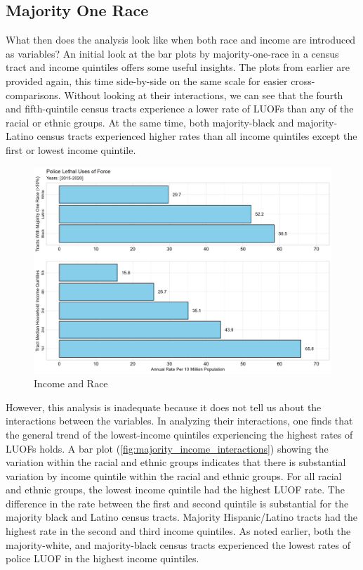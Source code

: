 \documentclass[12pt]{article}
\begin{document}
\subsection{Majority One Race}

What then does the analysis look like when both race and income are introduced as variables? An initial look at the bar plots by majority-one-race in a census tract and income quintiles offers some useful insights. The plots from earlier are provided again, this time side-by-side on the same scale for easier cross-comparisons. Without looking at their interactions, we can see that the fourth and fifth-quintile census tracts experience a lower rate of LUOFs than any of the racial or ethnic groups. At the same time, both majority-black and majority-Latino census tracts experienced higher rates than all income quintiles except the first or lowest income quintile.

\begin{figure}[H]
  \centering %
  \includegraphics[width=\linewidth]{images/combined}
  \captionsetup{justification=centering, singlelinecheck=false, margin=2cm}
  \caption[Income and Race]{Income and Race}
  \label{fig:combined}
\end{figure}

However, this analysis is inadequate because it does not tell us about the interactions between the variables. In analyzing their interactions, one finds that the general trend of the lowest-income quintiles experiencing the highest rates of LUOFs holds. A bar plot (\autoref{fig:majority_income_interactions}) showing the variation within the racial and ethnic groups indicates that there is substantial variation by income quintile within the racial and ethnic groups. For all racial and ethnic groups, the lowest income quintile had the highest LUOF rate. The difference in the rate between the first and second quintile is substantial for the majority black and Latino census tracts. Majority Hispanic/Latino tracts had the highest rate in the second and third income quintiles. As noted earlier, both the majority-white, and majority-black census tracts experienced the lowest rates of police LUOF in the highest income quintiles.
\end{document}
